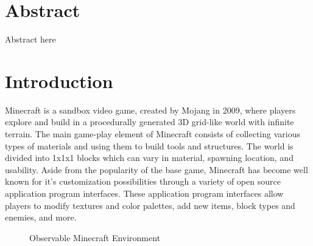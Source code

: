 \documentclass[11pt, oneside]{article}
\begin{document}
\begin{normalsize}

\section{Abstract}
\label{Abstract}

Abstract here

\newpage

\section{Introduction}
\label{Introduction}

	Minecraft is a sandbox video game, created by Mojang in 2009, where players explore and build in a procedurally generated 3D grid-like world with infinite terrain. The main game-play element of Minecraft consists of collecting various types of materials and using them to build tools and structures. The world is divided into 1x1x1 blocks which can vary in material, spawning location, and usability. Aside from the popularity of the base game, Minecraft has become well known for it's customization possibilities through a variety of open source application program interfaces. These application program interfaces allow players to modify textures and color palettes, add new items, block types and enemies, and more. 
	
\begin{figure}[H]%
    \centering
    \qquad
    \caption{Observable Minecraft Environment}%
    \label{fig:env}%
\end{figure}


\end{normalsize}
\end{document}
